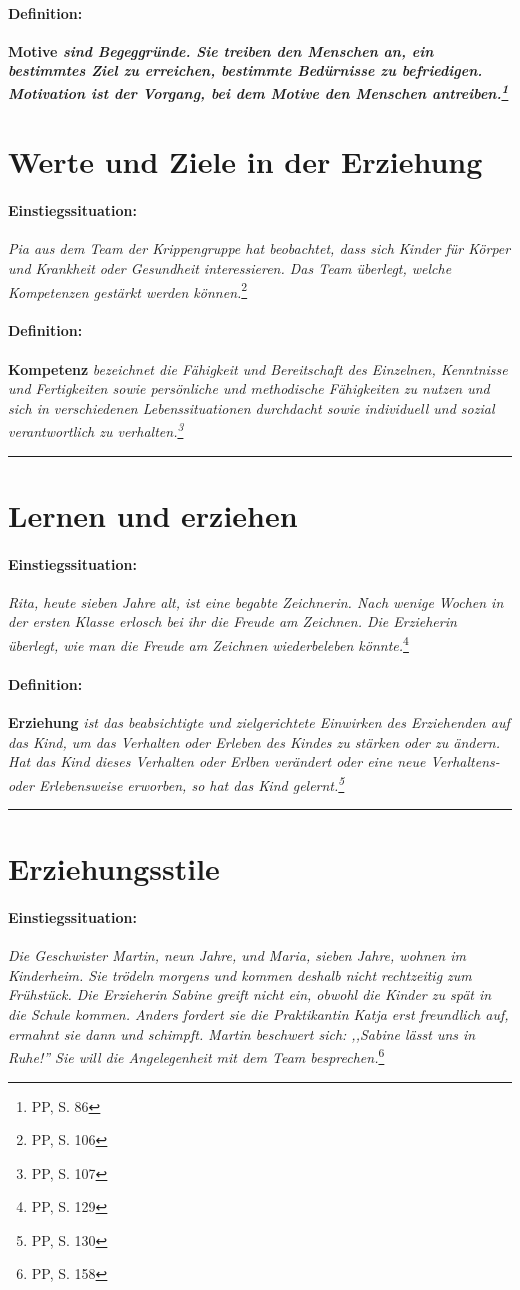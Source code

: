 \documentclass[12pt,a4paper]{article}
\newcommand\einstieg{\paragraph{\color{amethyst} {Einstiegssituation:}}}
\newcommand\definition{\paragraph{\color{red} {Definition:}}}
\begin{document}
\definition \bf{Motive} \sl{sind Begeggründe. Sie treiben den
  Menschen an, ein bestimmtes Ziel zu erreichen, bestimmte Bedürnisse zu
  befriedigen. Motivation ist der Vorgang, bei dem Motive den Menschen
  antreiben.}\footnote{\label{Motive} PP, S. 86}

\newpage
{ \color{coolblack}
  \section{Werte und Ziele in der Erziehung} }

\einstieg {\sl Pia aus dem Team der Krippengruppe hat beobachtet, dass sich Kinder für
  Körper und Krankheit oder Gesundheit interessieren. Das Team überlegt, welche
  Kompetenzen gestärkt werden können.}\footnote{\label{F-Pia} PP, S. 106}

\definition {\bf Kompetenz} \sl{bezeichnet die Fähigkeit und
  Bereitschaft des Einzelnen, Kenntnisse und Fertigkeiten sowie persönliche und
  methodische Fähigkeiten zu nutzen und sich in verschiedenen Lebenssituationen
  durchdacht sowie individuell und sozial verantwortlich zu
  verhalten.}\footnote{\label{Kompetenz} PP, S. 107}

\vskip 16pt \hrule
{ \color{coolblack}
  \section{Lernen und erziehen} }

\einstieg {\sl Rita, heute sieben Jahre alt, ist eine begabte
  Zeichnerin. Nach wenige Wochen in der ersten Klasse erlosch bei ihr die Freude
  am Zeichnen. Die Erzieherin überlegt, wie man die Freude am Zeichnen
  wiederbeleben könnte.}\footnote{\label{F-Rita} PP, S. 129}

\definition {\bf Erziehung} \sl{ist das beabsichtigte und
  zielgerichtete Einwirken des Erziehenden auf das Kind, um das Verhalten oder
  Erleben des Kindes zu stärken oder zu ändern. Hat das Kind dieses Verhalten
  oder Erlben verändert oder eine neue Verhaltens- oder Erlebensweise erworben,
  so hat das Kind gelernt.}\footnote{\label{Erziehung} PP, S. 130}

\vskip 16pt \hrule
{ \color{coolblack}
  \section{Erziehungsstile} }

\einstieg {\sl Die Geschwister Martin, neun Jahre, und Maria, sieben Jahre,
  wohnen im Kinderheim. Sie trödeln morgens und kommen deshalb nicht
  rechtzeitig zum Frühstück. Die Erzieherin Sabine greift nicht ein, obwohl die
  Kinder zu spät in die Schule kommen. Anders fordert sie die Praktikantin Katja
  erst freundlich auf, ermahnt sie dann und schimpft. Martin beschwert sich:
  ,,Sabine lässt uns in Ruhe!'' Sie will die Angelegenheit mit dem Team
  besprechen.}\footnote{\label{F-Katja} PP, S. 158}
\end{document}
